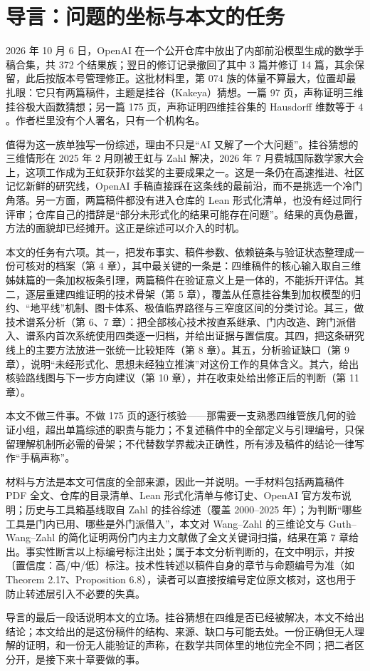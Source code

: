 \section{导言：问题的坐标与本文的任务}

2026 年 10 月 6 日，OpenAI 在一个公开仓库中放出了内部前沿模型生成的数学手稿合集，共 372 个结果族；翌日的修订记录撤回了其中 3 篇并修订 14 篇，其余保留，此后按版本号管理修正。这批材料里，第 074 族的体量不算最大，位置却最扎眼：它只有两篇稿件，主题是挂谷（Kakeya）猜想。一篇 97 页，声称证明三维挂谷极大函数猜想；另一篇 175 页，声称证明四维挂谷集的 Hausdorff 维数等于 $4$。作者栏里没有个人署名，只有一个机构名。

值得为这一族单独写一份综述，理由不只是“AI 又解了一个大问题”。挂谷猜想的三维情形在 2025 年 2 月刚被王虹与 Zahl 解决，2026 年 7 月费城国际数学家大会上，这项工作成为王虹获菲尔兹奖的主要成果之一。这是一条仍在高速推进、社区记忆新鲜的研究线，OpenAI 手稿直接踩在这条线的最前沿，而不是挑选一个冷门角落。另一方面，两篇稿件都没有进入仓库的 Lean 形式化清单，也没有经过同行评审；仓库自己的措辞是“部分未形式化的结果可能存在问题”。结果的真伪悬置，方法的面貌却已经摊开。这正是综述可以介入的时机。

本文的任务有六项。其一，把发布事实、稿件参数、依赖链条与验证状态整理成一份可核对的档案（第 4 章），其中最关键的一条是：四维稿件的核心输入取自三维姊妹篇的一条加权板条引理，两篇稿件在验证意义上是一体的，不能拆开评估。其二，逐层重建四维证明的技术骨架（第 5 章），覆盖从任意挂谷集到加权模型的归约、“地平线”机制、图卡体系、极值临界路径与三窄度区间的分类讨论。其三，做技术谱系分析（第 6、7 章）：把全部核心技术按直系继承、门内改造、跨门派借入、谱系内首次系统使用四类逐一归档，并给出证据与置信度。其四，把这条研究线上的主要方法放进一张统一比较矩阵（第 8 章）。其五，分析验证缺口（第 9 章），说明“未经形式化、思想未经独立推演”对这份工作的具体含义。其六，给出核验路线图与下一步方向建议（第 10 章），并在收束处给出修正后的判断（第 11 章）。

本文不做三件事。不做 175 页的逐行核验——那需要一支熟悉四维管族几何的验证小组，超出单篇综述的职责与能力；不复述稿件中的全部定义与引理编号，只保留理解机制所必需的骨架；不代替数学界裁决正确性，所有涉及稿件的结论一律写作“手稿声称”。

材料与方法是本文可信度的全部来源，因此一并说明。一手材料包括两篇稿件 PDF 全文、仓库的目录清单、Lean 形式化清单与修订史、OpenAI 官方发布说明；历史与工具箱基线取自 Zahl 的挂谷综述（覆盖 2000--2025 年）；为判断“哪些工具是门内已用、哪些是外门派借入”，本文对 Wang--Zahl 的三维论文与 Guth--Wang--Zahl 的简化证明两份门内主力文献做了全文关键词扫描，结果在第 7 章给出。事实性断言以上标编号标注出处；属于本文分析判断的，在文中明示，并按〔置信度：高/中/低〕标注。技术性转述以稿件自身的章节与命题编号为准（如 Theorem 2.17、Proposition 6.8），读者可以直接按编号定位原文核对，这也用于防止转述层引入不必要的失真。

导言的最后一段话说明本文的立场。挂谷猜想在四维是否已经被解决，本文不给出结论；本文给出的是这份稿件的结构、来源、缺口与可能去处。一份正确但无人理解的证明，和一份无人能验证的声称，在数学共同体里的地位完全不同；把二者区分开，是接下来十章要做的事。